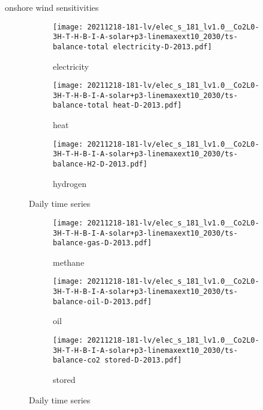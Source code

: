 onshore wind sensitivities



\begin{figure}
    \centering
    \begin{subfigure}[t]{\textwidth}
        \centering
        \caption{electricity}
        \texttt{[image: 20211218-181-lv/elec\_s\_181\_lv1.0\_\_Co2L0-3H-T-H-B-I-A-solar+p3-linemaxext10\_2030/ts-balance-total electricity-D-2013.pdf]}
    \end{subfigure}
    \begin{subfigure}[t]{\textwidth}
        \centering
        \caption{heat}
        \texttt{[image: 20211218-181-lv/elec\_s\_181\_lv1.0\_\_Co2L0-3H-T-H-B-I-A-solar+p3-linemaxext10\_2030/ts-balance-total heat-D-2013.pdf]}
    \end{subfigure}
    \begin{subfigure}[t]{\textwidth}
        \centering
        \caption{hydrogen}
        \texttt{[image: 20211218-181-lv/elec\_s\_181\_lv1.0\_\_Co2L0-3H-T-H-B-I-A-solar+p3-linemaxext10\_2030/ts-balance-H2-D-2013.pdf]}
    \end{subfigure}
    \caption{Daily time series}
    \label{fig:output-ts-1}
\end{figure}

\begin{figure}
    \centering
    \begin{subfigure}[t]{\textwidth}
        \centering
        \caption{methane}
        \texttt{[image: 20211218-181-lv/elec\_s\_181\_lv1.0\_\_Co2L0-3H-T-H-B-I-A-solar+p3-linemaxext10\_2030/ts-balance-gas-D-2013.pdf]}
    \end{subfigure}
    \begin{subfigure}[t]{\textwidth}
        \centering
        \caption{oil}
        \texttt{[image: 20211218-181-lv/elec\_s\_181\_lv1.0\_\_Co2L0-3H-T-H-B-I-A-solar+p3-linemaxext10\_2030/ts-balance-oil-D-2013.pdf]}
    \end{subfigure}
    \begin{subfigure}[t]{\textwidth}
        \centering
        \caption{stored \co}
        \texttt{[image: 20211218-181-lv/elec\_s\_181\_lv1.0\_\_Co2L0-3H-T-H-B-I-A-solar+p3-linemaxext10\_2030/ts-balance-co2 stored-D-2013.pdf]}
    \end{subfigure}
    \caption{Daily time series}
    \label{fig:output-ts-2}
\end{figure}


